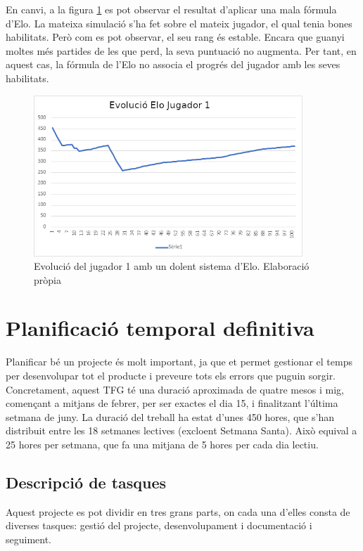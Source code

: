 \documentclass[a4paper]{article}
\begin{document}
En canvi, a la figura \ref{fig:BadElo} es pot observar el resultat d'aplicar una mala fórmula d'Elo. La mateixa simulació s'ha fet sobre el mateix jugador, el qual tenia bones habilitats. Però com es pot observar, el seu rang és estable. Encara que guanyi moltes més partides de les que perd, la seva puntuació no augmenta. Per tant, en aquest cas, la fórmula de l'Elo no associa el progrés del jugador amb les seves habilitats.

\begin{figure}[H]
    \centering
    \includegraphics[width=0.9\textwidth]{images/PlayerEloDolent.png}
    \caption[Evolució del jugador 1 amb un dolent sistema d'Elo]{Evolució del jugador 1 amb un dolent sistema d'Elo. Elaboració pròpia}
    \label{fig:BadElo}
\end{figure}

\newpage
\section{Planificació temporal definitiva}
Planificar bé un projecte és molt important, ja que et permet gestionar el temps per desenvolupar tot el producte i preveure tots els errors que puguin sorgir. Concretament, aquest TFG té una duració aproximada de quatre mesos i mig, començant a mitjans de febrer, per ser exactes el dia 15, i finalitzant l'última setmana de juny. La duració del treball ha estat d'unes 450 hores, que s'han distribuit entre les 18 setmanes lectives (excloent Setmana Santa). Això equival a 25 hores per setmana, que fa una mitjana de 5 hores per cada dia lectiu. 

\subsection{Descripció de tasques}
Aquest projecte es pot dividir en tres grans parts, on cada una d'elles consta de diverses tasques: gestió del projecte, desenvolupament i documentació i seguiment.
\end{document}
